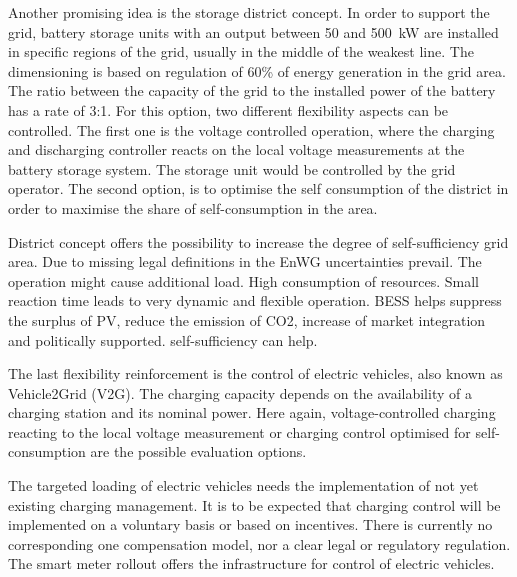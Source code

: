 Another promising idea is the storage district concept. In order to support the grid, battery storage units with an output between 50 and 500~kW are installed in specific regions of the grid, usually in the middle of the weakest line. The dimensioning is based on regulation of 60\% of energy generation in the grid area. The ratio between the capacity of the grid to the installed power of the battery has a rate of 3:1. For this option, two different flexibility aspects can be controlled. The first one is the voltage controlled operation, where the charging and discharging controller reacts on the local voltage measurements at the battery storage system. The storage unit would be controlled by the grid operator. The second option, is to optimise the self consumption of the district in order to maximise the share of self-consumption in the area.~\cite{mona}

District concept offers the possibility to increase the degree of self-sufficiency grid area. Due to missing legal definitions in the EnWG uncertainties prevail. The operation might cause additional load. High consumption of resources. Small reaction time leads to very dynamic and flexible operation. BESS helps suppress the surplus of PV, reduce the emission of CO2, increase of market integration and politically supported. self-sufficiency can help.~\cite{monamaßnahmen}

The last flexibility reinforcement is the control of electric vehicles, also known as Vehicle2Grid (V2G). The charging capacity depends on the availability of a
charging station and its nominal power. Here again, voltage-controlled charging reacting to the local voltage measurement or charging control optimised for self-consumption are the possible evaluation options.~\cite{noauthor_peak_2019}


The targeted loading of electric vehicles needs the implementation of not yet existing charging management. It is to be expected that charging control will be implemented on a voluntary basis or based on incentives. There is currently no corresponding one compensation model, nor a clear legal or regulatory regulation. The smart meter rollout offers the infrastructure for control of electric vehicles.~\cite{monamaßnahmen}

